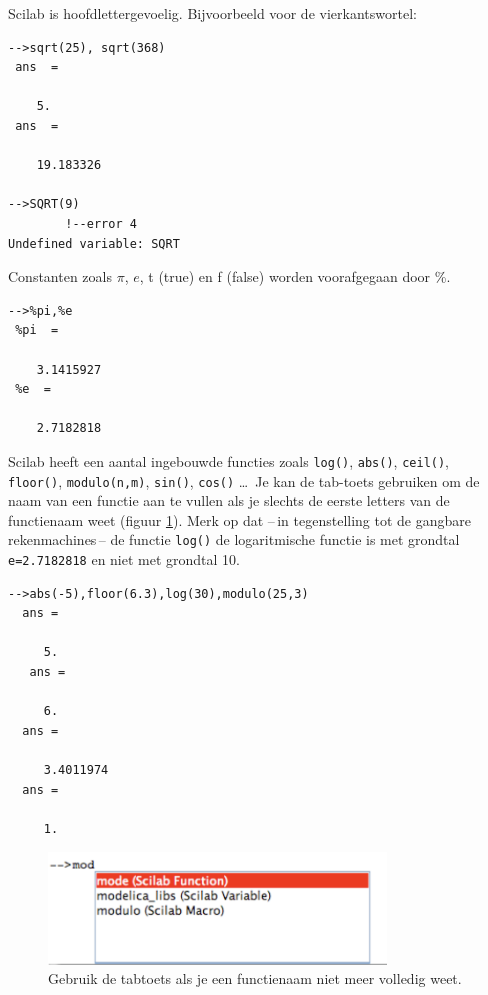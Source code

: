 Scilab is hoofdlettergevoelig. Bijvoorbeeld voor de vierkantswortel:


\begin{lstlisting}[caption={Vierkantswortel}, label={vierkantswortel}]
-->sqrt(25), sqrt(368)
 ans  =
 
    5.  
 ans  =
 
    19.183326
    
-->SQRT(9)
        !--error 4 
Undefined variable: SQRT     
\end{lstlisting}


Constanten zoals $\pi$, $e$, t (true) en f (false) worden voorafgegaan door \%.

\begin{lstlisting}[caption={Constanten}, label=constanten]
-->%pi,%e 
 %pi  =
 
    3.1415927  
 %e  =
 
    2.7182818  
 \end{lstlisting}


Scilab heeft een aantal ingebouwde functies zoals \verb+log()+, \verb+abs()+, \verb+ceil()+,\\ \verb+floor()+, \verb+modulo(n,m)+, \verb+sin()+, \verb+cos()+ \ldots\ Je kan de tab-toets gebruiken om de naam van een functie aan te vullen als je slechts de eerste letters van de functienaam weet (figuur \ref{fig:tabtoets}). Merk op dat --\,in tegenstelling tot de gangbare rekenmachines\,-- de functie \verb/log()/ de logaritmische functie is met grondtal \verb/e=2.7182818/ en niet met grondtal 10.

\begin{lstlisting}[caption={Enkele ingebouwde functies}, label=ingebouwdefuncties]
-->abs(-5),floor(6.3),log(30),modulo(25,3)
  ans =

     5.
   ans =

     6.
  ans =

     3.4011974
  ans =

     1.
\end{lstlisting}

\begin{figure}[h!t]
   \begin{center}
    \includegraphics[width=0.8\textwidth]{figuren/scilab/02tabtoets}
  \caption{Gebruik de tabtoets als je een functienaam niet meer volledig weet.}
	\label{fig:tabtoets}
	\end{center}
\end{figure}

